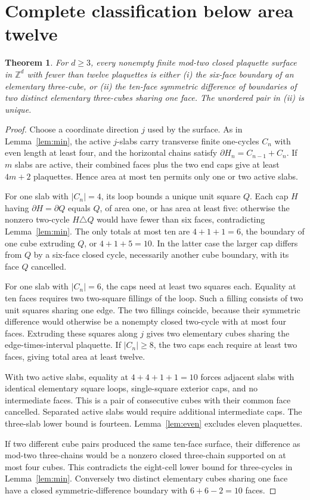 \documentclass[11pt,a4paper]{article}
\newtheorem{theorem}{Theorem}
\begin{document}
\section{Complete classification below area twelve}
\begin{theorem}\label{thm:small}
For \(d\ge3\), every nonempty finite mod-two closed plaquette surface in \(\mathbb Z^d\) with fewer than twelve plaquettes is either (i) the six-face boundary of an elementary three-cube, or (ii) the ten-face symmetric difference of boundaries of two distinct elementary three-cubes sharing one face. The unordered pair in (ii) is unique.
\end{theorem}
\begin{proof}
Choose a coordinate direction \(j\) used by the surface. As in Lemma~\ref{lem:min}, the active \(j\)-slabs carry transverse finite one-cycles \(C_n\) with even length at least four, and the horizontal chains satisfy \(\partial H_n=C_{n-1}+C_n\). If \(m\) slabs are active, their combined faces plus the two end caps give at least \(4m+2\) plaquettes. Hence area at most ten permits only one or two active slabs.

For one slab with \(|C_n|=4\), its loop bounds a unique unit square \(Q\). Each cap \(H\) having \(\partial H=\partial Q\) equals \(Q\), of area one, or has area at least five: otherwise the nonzero two-cycle \(H\triangle Q\) would have fewer than six faces, contradicting Lemma~\ref{lem:min}. The only totals at most ten are \(4+1+1=6\), the boundary of one cube extruding \(Q\), or \(4+1+5=10\). In the latter case the larger cap differs from \(Q\) by a six-face closed cycle, necessarily another cube boundary, with its face \(Q\) cancelled.

For one slab with \(|C_n|=6\), the caps need at least two squares each. Equality at ten faces requires two two-square fillings of the loop. Such a filling consists of two unit squares sharing one edge. The two fillings coincide, because their symmetric difference would otherwise be a nonempty closed two-cycle with at most four faces. Extruding these squares along \(j\) gives two elementary cubes sharing the edge-times-interval plaquette. If \(|C_n|\ge8\), the two caps each require at least two faces, giving total area at least twelve.

With two active slabs, equality at \(4+4+1+1=10\) forces adjacent slabs with identical elementary square loops, single-square exterior caps, and no intermediate faces. This is a pair of consecutive cubes with their common face cancelled. Separated active slabs would require additional intermediate caps. The three-slab lower bound is fourteen. Lemma~\ref{lem:even} excludes eleven plaquettes.

If two different cube pairs produced the same ten-face surface, their difference as mod-two three-chains would be a nonzero closed three-chain supported on at most four cubes. This contradicts the eight-cell lower bound for three-cycles in Lemma~\ref{lem:min}. Conversely two distinct elementary cubes sharing one face have a closed symmetric-difference boundary with \(6+6-2=10\) faces.
\end{proof}
\end{document}
